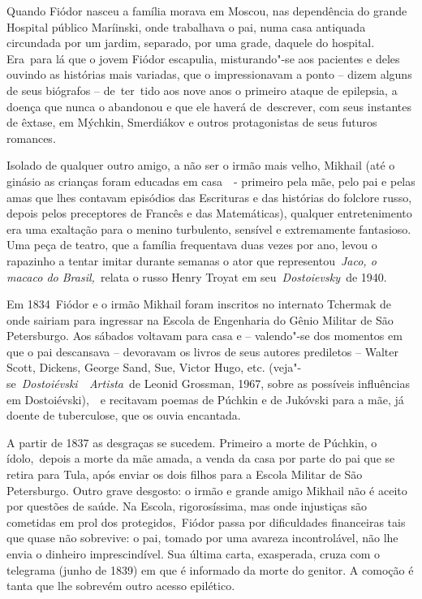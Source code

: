 Quando Fiódor nasceu a família morava em Moscou, nas dependência do
grande Hospital público Maríinski, onde trabalhava o pai, numa casa
antiquada circundada por um jardim, separado, por uma grade, daquele do
hospital. Era~para lá que o jovem Fiódor escapulia, misturando"-se aos
pacientes e deles ouvindo as histórias mais variadas, que o
impressionavam a ponto -- dizem alguns de seus biógrafos -- de~ter~tido
aos nove anos o primeiro ataque de epilepsia, a doença que nunca o
abandonou e que ele haverá de~descrever, com seus instantes de êxtase,
em Mýchkin, Smerdiákov e outros protagonistas de seus futuros romances.

Isolado de qualquer outro amigo, a não ser o irmão mais velho, Mikhail
(até o ginásio as crianças foram educadas em casa~~- primeiro pela mãe,
pelo pai e pelas amas que lhes contavam episódios das Escrituras e das
histórias do folclore russo, depois pelos preceptores de Francês e das
Matemáticas), qualquer entretenimento era uma exaltação para o menino
turbulento, sensível e extremamente fantasioso. Uma peça de teatro, que
a família frequentava duas vezes por ano, levou o rapazinho a tentar
imitar durante semanas o ator que representou~\emph{Jaco, o macaco do
Brasil,~}relata o russo Henry Troyat em seu~\emph{Dostoievsky~}de 1940.

Em 1834~Fiódor e o irmão Mikhail foram inscritos no internato Tchermak
de onde sairiam para ingressar na Escola de Engenharia do Gênio Militar
de São Petersburgo. Aos sábados voltavam para casa e -- valendo"-se dos
momentos em que o pai descansava -- devoravam os livros de seus autores
prediletos -- Walter Scott, Dickens, George Sand, Sue, Victor Hugo, etc.
(veja"-se~\emph{Dostoiévski~~Artista}~de Leonid Grossman, 1967, sobre as
possíveis influências em Dostoiévski),~~e recitavam poemas de Púchkin e
de Jukóvski para a mãe, já doente de tuberculose, que os ouvia
encantada.

A partir de 1837 as desgraças se sucedem. Primeiro a morte de Púchkin, o
ídolo,~depois a morte da mãe amada, a venda da casa por parte do pai que
se retira para Tula, após enviar os dois filhos para a Escola Militar de
São Petersburgo. Outro grave desgosto: o irmão e grande amigo Mikhail
não é aceito por questões de saúde. Na Escola, rigorosíssima, mas onde
injustiças são cometidas em prol dos protegidos,~Fiódor passa por
dificuldades financeiras tais que quase não sobrevive: o pai, tomado por
uma avareza incontrolável, não lhe envia o dinheiro imprescindível. Sua
última carta, exasperada, cruza com o telegrama (junho de 1839) em que é
informado da morte do genitor. A comoção é tanta que lhe sobrevém outro
acesso epilético.

